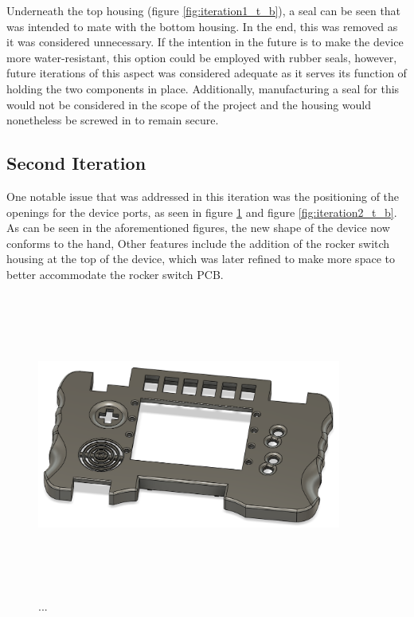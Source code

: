 Underneath the top housing (figure \ref{fig:iteration1_t_b}), a seal can be seen that was intended to mate with the bottom housing.
In the end, this was removed as it was considered unnecessary.
If the intention in the future is to make the device more water-resistant, this option could be employed with rubber seals, however, future iterations of this aspect was considered adequate as it serves its function of holding the two components in place.
Additionally, manufacturing a seal for this would not be considered in the scope of the project and the housing would nonetheless be screwed in to remain secure.

\subsection{Second Iteration}

One notable issue that was addressed in this iteration was the positioning of the openings for the device ports, as seen in figure \ref{fig:iteration2_t_f} and figure \ref{fig:iteration2_t_b}.
As can be seen in the aforementioned figures, the new shape of the device now conforms to the hand,
Other features include the addition of the rocker switch housing at the top of the device, which was later refined to make more space to better accommodate the rocker switch PCB.

\begin{figure} [h]
    \centering
    \includegraphics[width=10cm,height=10cm,keepaspectratio]{Figures/iteration2_top_front.png}
    \caption{...}
    \label{fig:iteration2_t_f}
\end{figure}

